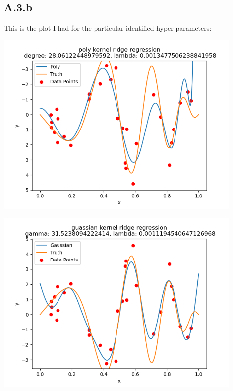 \documentclass[]{article}
\begin{document}
    \subsection*{A.3.b}
        This is the plot I had for the particular identified hyper parameters: 
        \begin{center}
            \includegraphics*[width=12cm]{A3b-poly.png}
        \end{center}
        \begin{center}
            \includegraphics*[width=12cm]{A3b-gauss.png}
        \end{center}
        
\end{document}
